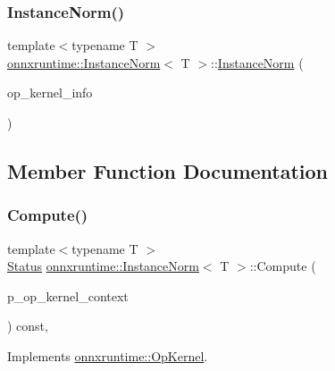 \subsubsection{\texorpdfstring{Instance\+Norm()}{InstanceNorm()}}
{\footnotesize\ttfamily template$<$typename T $>$ \\
\mbox{\hyperlink{classonnxruntime_1_1InstanceNorm}{onnxruntime\+::\+Instance\+Norm}}$<$ T $>$\+::\mbox{\hyperlink{classonnxruntime_1_1InstanceNorm}{Instance\+Norm}} (\begin{DoxyParamCaption}\item[{const \mbox{\hyperlink{classonnxruntime_1_1OpKernelInfo}{Op\+Kernel\+Info}} \&}]{op\+\_\+kernel\+\_\+info }\end{DoxyParamCaption})\hspace{0.3cm}{\ttfamily [inline]}}



\subsection{Member Function Documentation}
\mbox{\label{classonnxruntime_1_1InstanceNorm_a2e2125780530aa940c2b9271df4ed19d}} 
\subsubsection{\texorpdfstring{Compute()}{Compute()}\hspace{0.1cm}{\footnotesize\ttfamily [1/2]}}
{\footnotesize\ttfamily template$<$typename T $>$ \\
\mbox{\hyperlink{classonnxruntime_1_1common_1_1Status}{Status}} \mbox{\hyperlink{classonnxruntime_1_1InstanceNorm}{onnxruntime\+::\+Instance\+Norm}}$<$ T $>$\+::Compute (\begin{DoxyParamCaption}\item[{\mbox{\hyperlink{classonnxruntime_1_1OpKernelContext}{Op\+Kernel\+Context}} $\ast$}]{p\+\_\+op\+\_\+kernel\+\_\+context }\end{DoxyParamCaption}) const\hspace{0.3cm}{\ttfamily [override]}, {\ttfamily [virtual]}}



Implements \mbox{\hyperlink{classonnxruntime_1_1OpKernel_a9eca8656a78b1b3ab9d3351a12798650}{onnxruntime\+::\+Op\+Kernel}}.

